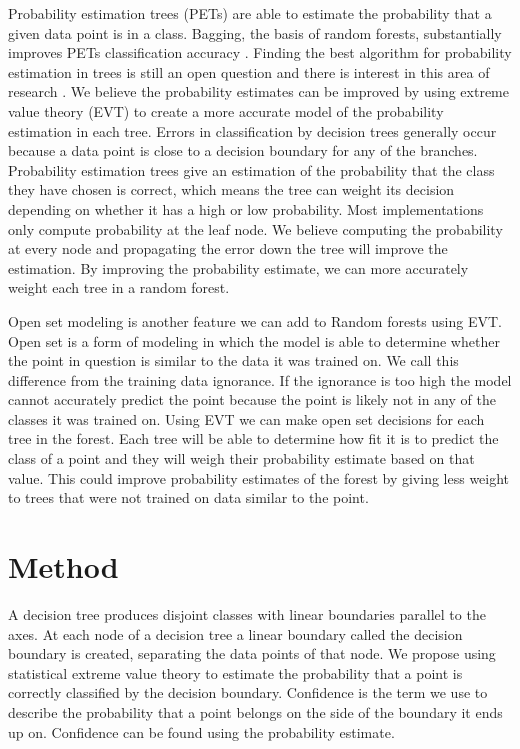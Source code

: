 \documentclass[conference]{IEEEtran}
\begin{document}
 Probability estimation trees (PETs) are able to estimate the 
 probability that a given data point is in a class.  Bagging, the basis of random forests, substantially 
 improves PETs classification accuracy \cite{baggingPETs}.  Finding the best algorithm for probability estimation
 in trees is still an open question and there is interest in this area of research 
 \cite{RandomForestPET}. We believe the probability estimates can be 
 improved by using extreme value theory (EVT) \cite{EVT} to create a more accurate model of the probability 
 estimation in each tree.  Errors in classification by decision trees generally occur because a data point is close to 
 a decision boundary for any of the branches.  Probability estimation trees give an estimation of the probability that the
 class they have chosen is correct,  which means the tree can weight its decision depending on whether it has a high or low probability.  Most implementations only compute probability at the leaf node.  We believe computing the probability at every node and propagating the error down the tree will improve the estimation.  By improving the probability estimate, we can more accurately weight each tree in a random forest.  \par
 
 Open set modeling is another feature we can add to Random forests using EVT.  Open set is a form of modeling 
 in which the model is able to determine whether the point in question is similar to the data it was trained on.  We call this
  difference from the training data ignorance.  If the ignorance is too high the model cannot accurately predict the point 
 because the point is likely not in any of the classes it was trained on.  Using EVT we can
  make open set decisions for each tree in the forest.  Each tree will be able to determine how fit it is to predict the class of
  a point and they will weigh their probability estimate based on that value.  This could improve probability
 estimates of the forest by giving less weight to trees that were not trained on data similar to the point.

\section{Method}

A decision tree produces disjoint classes with linear boundaries parallel to the axes.  At each node of a decision
tree a linear boundary called the decision boundary is created, separating the data points of that node.  
We propose using statistical extreme value theory to estimate the probability that a point is correctly classified by 
the decision boundary. Confidence is the term we use to describe the probability that a point belongs on the side 
of the boundary it ends up on.  Confidence can be found using the probability estimate.  \par
\end{document}
